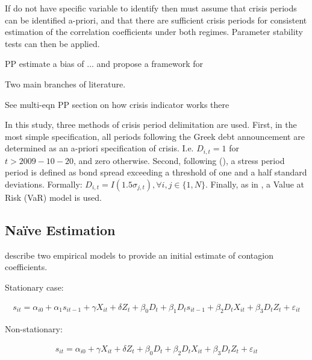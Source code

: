 \documentclass[../base.tex]{subfiles}
\begin{document}
If do not have specific variable to identify then must assume that crisis periods can be identified a-priori, and that there are sufficient crisis periods for consistent estimation of the correlation coefficients under both regimes. Parameter stability tests can then be applied. 

PP estimate a bias of ... and propose a framework for 

Two main branches of literature. 


See multi-eqn PP section on how crisis indicator works there

In this study, three methods of crisis period delimitation are used. First, in the most simple specification, all periods following the Greek debt announcement are determined as an a-priori specification of crisis. I.e. $D_{i,t} = 1$ for $t > 2009-10-20$, and zero otherwise. Second, following (), a stress period period is defined as bond spread exceeding a threshold of one and a half standard deviations. Formally: $D_{i,t} = I(1.5\sigma_{j,t}), \forall i, j \in \{1, N\}$. Finally, as in \cite{metiu2012sovereign}, a Value at Risk (VaR) model is used. 


\subsection{Na\"{i}ve Estimation}

\cite{giordano2013pure} describe two empirical models to provide an initial estimate of contagion coefficients. 

Stationary case:

\begin{align}
	s_{it} = \alpha_{i0} + \alpha_{1}s_{it-1} +\gamma X_{it} + \delta Z_t + \beta_0D_t + \beta_1D_ts_{it-1} + \beta_2D_tX_{it} + \beta_3D_tZ_t + \varepsilon_{it}
\end{align}

Non-stationary:

\begin{align}
	s_{it} = \alpha_{i0} + \gamma X_{it} + \delta Z_t + \beta_0D_t + \beta_2D_tX_{it} + \beta_3D_tZ_t + \varepsilon_{it}
\end{align}
\end{document}
